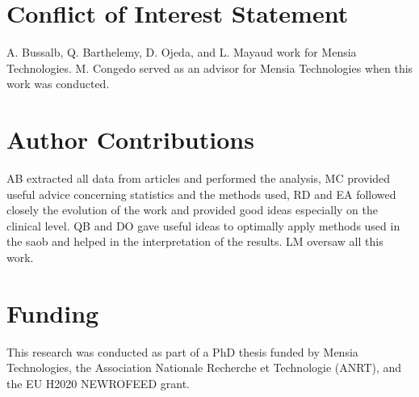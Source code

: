 
\section*{Conflict of Interest Statement}
A. Bussalb, Q. Barthelemy, D. Ojeda, and L. Mayaud work for Mensia Technologies.
M. Congedo served as an advisor for Mensia Technologies when this work was conducted.  

\section*{Author Contributions}
AB extracted all data from articles and performed the analysis, MC provided useful advice 
concerning statistics and the methods used, RD and EA followed closely the evolution of 
the work and provided good ideas especially on the clinical level. QB and DO gave useful 
ideas to optimally apply methods used in the \gls{saob} and helped in the interpretation 
of the results. LM oversaw all this work. 

\section*{Funding}
This research was conducted as part of a PhD thesis funded by Mensia Technologies, the 
Association Nationale Recherche et Technologie (ANRT), and the EU H2020 NEWROFEED grant.

